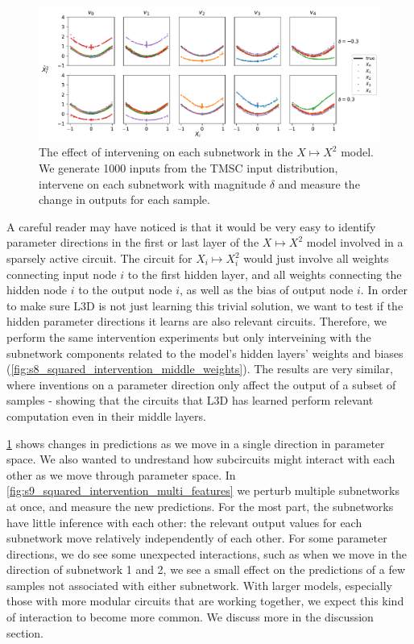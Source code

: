 \documentclass{article}
\theoremstyle{plain}
\theoremstyle{definition}
\theoremstyle{remark}
\begin{document}
\begin{figure}[htbp]
    \centerline{\includegraphics[width=\textwidth]{../figures/9_squared_intervention.pdf}}
    \centering
    \caption{The effect of intervening on each subnetwork in the $X \mapsto X^2$ model. We generate 1000 inputs from the TMSC input distribution, intervene on each subnetwork with magnitude $\delta$ and measure the change in outputs for each sample.}\label{fig:9_squared_intervention}
\end{figure}


A careful reader may have noticed is that it would be very easy to identify parameter directions in the first or last layer of the $X \mapsto X^2$ model involved in a sparsely active circuit. The circuit for $X_i \mapsto X_i^2$ would just involve all weights connecting input node $i$ to the first hidden layer, and all weights connecting the hidden node $i$ to the output node $i$, as well as the bias of output node $i$. In order to make sure L3D is not just learning this trivial solution, we want to test if the hidden parameter directions it learns are also relevant circuits. Therefore, we perform the same intervention experiments but only interveining with the subnetwork components related to the model's hidden layers' weights and biases (\ref{fig:s8_squared_intervention_middle_weights}). The results are very similar, where inventions on a parameter direction only affect the output of a subset of samples - showing that the circuits that L3D has learned perform relevant computation even in their middle layers. 



\ref{fig:9_squared_intervention} shows changes in predictions as we move in a single direction in parameter space. We also wanted to undrestand how subcircuits might interact with each other as we move through parameter space. In \ref{fig:s9_squared_intervention_multi_features} we perturb multiple subnetworks at once, and measure the new predictions. For the most part, the subnetworks have little inference with each other: the relevant output values for each subnetwork move relatively independently of each other. For some parameter directions, we do see some unexpected interactions, such as when we move in the direction of subnetwork 1 and 2, we see a small effect on the predictions of a few samples not associated with either subnetwork. With larger models, especially those with more modular circuits that are working together, we expect this kind of interaction to become more common. We discuss more in the discussion section. 
\end{document}

